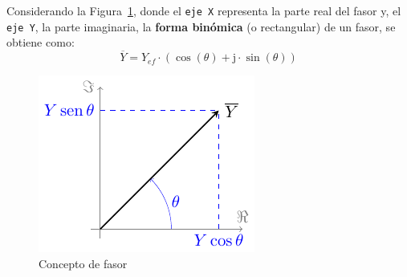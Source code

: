 

	
Considerando la Figura~\ref{fig:fasor}, donde el \texttt{eje X}
representa la parte real del fasor y, el \texttt{eje Y}, la parte
imaginaria, la \textbf{forma binómica} (o rectangular) de un fasor, se
obtiene como:
\begin{equation}
  \boxed{\overline{Y} = Y_{ef}\cdot(\cos(\theta)+\mathrm{j}\cdot\sin(\theta))}
\end{equation}
\begin{figure}[H]
  \centering \includegraphics{../figs/fasor.pdf}
  \caption{Concepto de fasor}
  \label{fig:fasor}
\end{figure}
	
